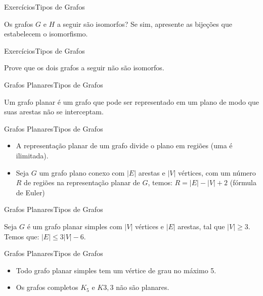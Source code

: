 \documentclass[t]{beamer}
\begin{document}

\begin{ftst}{Exercícios}{Tipos de Grafos}

Os grafos $G$ e $H$ a seguir são isomorfos? Se sim, apresente as bijeções que estabelecem o isomorfismo.

\vone
\centering


\end{ftst}



\begin{ftst}{Exercícios}{Tipos de Grafos}

Prove que os dois grafos a seguir não são isomorfos.

\vone
\centering


\end{ftst}



\begin{ftst}{Grafos Planares}{Tipos de Grafos}

Um grafo planar é um grafo que pode ser representado em um plano de modo que suas arestas não se interceptam.

\vone
\centering


\end{ftst}



\begin{ftst}{Grafos Planares}{Tipos de Grafos}
\begin{itemize}
    \item A representação planar de um grafo divide o plano em regiões (uma é ilimitada).
    \item Seja $G$ um grafo plano conexo com $|E|$ arestas e $|V|$ vértices, com um número $R$ de regiões na representação planar de $G$, temos: $R=|E| - |V|+2$ (fórmula de Euler)
\end{itemize}

\vone
\centering


\end{ftst}



\begin{ftst}{Grafos Planares}{Tipos de Grafos}

Seja $G$ é um grafo planar simples com $|V|$ vértices e $|E|$ arestas, tal que $|V| \geq 3$. Temos que: $|E| \leq 3|V| - 6$.

\vone
\vone
\vone
\vone

\centering


\end{ftst}



\begin{ftst}{Grafos Planares}{Tipos de Grafos}
\begin{itemize}
    \item Todo grafo planar simples tem um vértice de grau no máximo 5.
    \item Os grafos completos $K_5$ e $K{3,3}$ não são planares.
\end{itemize}
\vone
\vone
\centering


\end{ftst}


\end{document}
